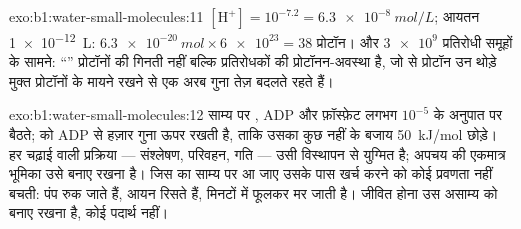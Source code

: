 \begin{solution}{exo:b1:water-small-molecules:11}
$[\mathrm{H^+}] = 10^{-7.2} = \qty{6.3e-8}{mol/L}$; आयतन
\qty{1e-12}{L}: $\qty{6.3e-20}{mol}\times\num{6e23} = 38$ प्रोटॉन। और
$\num{3e9}$ प्रतिरोधी समूहों के सामने: ``'' प्रोटॉनों की गिनती नहीं बल्कि
प्रतिरोधकों की प्रोटॉनन-अवस्था है, जो  से प्रोटॉन उन थोड़े मुक्त
प्रोटॉनों के मायने रखने से एक अरब गुना तेज़ बदलते रहते हैं।
\end{solution}

\begin{solution}{exo:b1:water-small-molecules:12}
साम्य पर , ADP और फ़ॉस्फ़ेट लगभग
$10^{-5}$ के अनुपात पर बैठते;   को ADP से हज़ार गुना ऊपर रखती है,
ताकि उसका  कुछ नहीं के बजाय \qty{50}{kJ/mol} छोड़े। हर चढ़ाई वाली
प्रक्रिया --- संश्लेषण, परिवहन, गति --- उसी विस्थापन से युग्मित है;
अपचय की एकमात्र भूमिका उसे बनाए रखना है। जिस  का 
साम्य पर आ जाए उसके पास खर्च करने को कोई प्रवणता नहीं बचती: पंप रुक जाते
हैं, आयन रिसते हैं,  मिनटों में फूलकर मर जाती है। जीवित होना उस
असाम्य को बनाए रखना है, कोई पदार्थ नहीं।
\end{solution}

